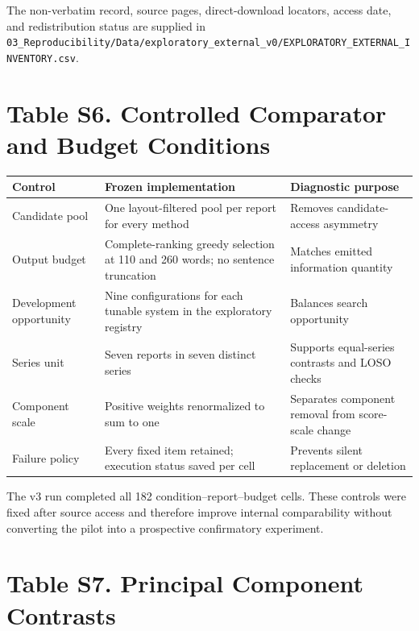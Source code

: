 \documentclass[11pt]{article}
\begin{document}
The non-verbatim record, source pages, direct-download locators, access date, and redistribution status are supplied in \nolinkurl{03_Reproducibility/Data/exploratory_external_v0/EXPLORATORY_EXTERNAL_INVENTORY.csv}.

\section*{Table S6. Controlled Comparator and Budget Conditions}

\begin{center}
\small
\begin{tabularx}{\textwidth}{lXX}
\toprule
Control & Frozen implementation & Diagnostic purpose\\
\midrule
Candidate pool & One layout-filtered pool per report for every method & Removes candidate-access asymmetry\\
Output budget & Complete-ranking greedy selection at 110 and 260 words; no sentence truncation & Matches emitted information quantity\\
Development opportunity & Nine configurations for each tunable system in the exploratory registry & Balances search opportunity\\
Series unit & Seven reports in seven distinct series & Supports equal-series contrasts and LOSO checks\\
Component scale & Positive weights renormalized to sum to one & Separates component removal from score-scale change\\
Failure policy & Every fixed item retained; execution status saved per cell & Prevents silent replacement or deletion\\
\bottomrule
\end{tabularx}
\end{center}

The v3 run completed all 182 condition--report--budget cells. These controls were fixed after source access and therefore improve internal comparability without converting the pilot into a prospective confirmatory experiment.

\section*{Table S7. Principal Component Contrasts}
\end{document}
